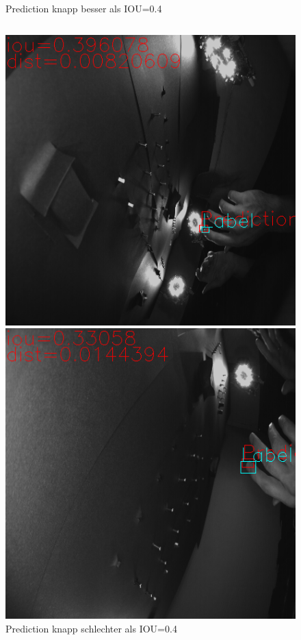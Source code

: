\documentclass[a4paper,12pt]{article}
\begin{document}
\begin{figure}
\begin{minipage}[b]{0.48\textwidth}
	\end{minipage}
	\caption{Prediction knapp besser als IOU=0.4}
	\label{img:iou_knapp_gut}
	\begin{verbatim}
	\end{verbatim}
	\centering
	\begin{minipage}[b]{0.48\textwidth}	
		\includegraphics[width=\textwidth]{BilderResultate/6iouKnappSchlecht.png}
	\end{minipage}
	\hfill
	\begin{minipage}[b]{0.48\textwidth}		
		\includegraphics[width=\textwidth]{BilderResultate/9iouKnappSchlecht.png}
	\end{minipage}
	\caption{Prediction knapp schlechter als IOU=0.4}
	\label{img:iou_knapp_schlecht}
\end{figure}
\end{document}

